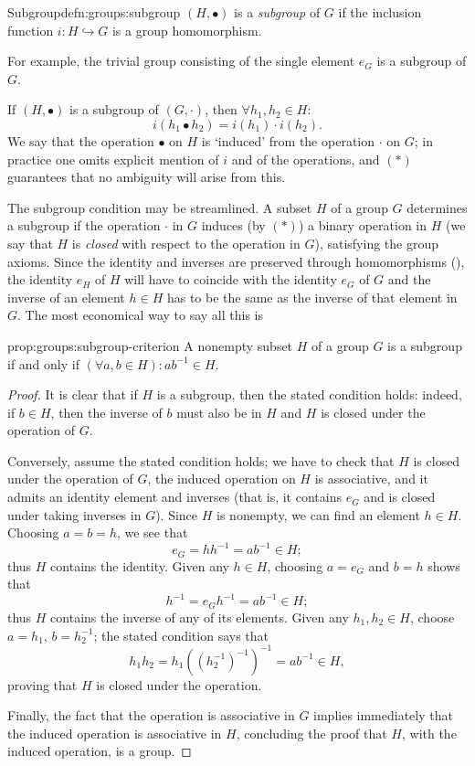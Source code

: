 \begin{defn}{Subgroup}{defn:groups:subgroup}
  $(H, \bullet)$ is a \emph{subgroup} of $G$ if the inclusion function
  $i : H \hookrightarrow G$ is a group homomorphism.
\end{defn}

For example, the trivial group consisting of the single element $e_G$
is a subgroup of $G$.

If $(H, \bullet)$ is a subgroup of $(G, \cdot)$, then
$\forall h_1, h_2 \in H$:
\[
  i(h_1 \bullet h_2) = i(h_1) \cdot i(h_2). \tag{$*$}
\]
We say that the operation $\bullet$ on $H$ is `induced' from the
operation $\cdot$ on $G$; in practice one omits explicit mention of
$i$ and of the operations, and $(*)$ guarantees that no ambiguity will
arise from this.

The subgroup condition may be streamlined. A subset $H$ of a group $G$
determines a subgroup if the operation $\cdot$ in $G$ induces (by
$(*)$) a binary operation in $H$ (we say that $H$ is \emph{closed}
with respect to the operation in $G$), satisfying the group
axioms. Since the identity and inverses are preserved through
homomorphisms (), the
identity $e_H$ of $H$ will have to coincide with the identity $e_G$ of
$G$ and the inverse of an element $h \in H$ has to be the same as the
inverse of that element in $G$. The most economical way to say all
this is

\begin{prop}{}{prop:groups:subgroup-criterion}
  A nonempty subset $H$ of a group $G$ is a subgroup if and
    only if
    $(\forall a, b \in H) : ab^{-1} \in
    H$.
\end{prop}
\begin{proof}
  It is clear that if $H$ is a subgroup, then the stated condition
  holds: indeed, if $b \in H$, then the inverse of $b$ must also be in
  $H$ and $H$ is closed under the operation of $G$.

  Conversely, assume the stated condition holds; we have to check that
  $H$ is closed under the operation of $G$, the induced operation on
  $H$ is associative, and it admits an identity element and inverses
  (that is, it contains $e_G$ and is closed under taking inverses in
  $G$). Since $H$ is nonempty, we can find an element $h \in
  H$. Choosing $a = b = h$, we see that
  \[
    e_G = hh^{-1} = ab^{-1} \in H;
  \]
  thus $H$ contains the identity. Given any $h \in H$, choosing
  $a = e_G$ and $b = h$ shows that
  \[
    h^{-1} = e_G h^{-1} = ab^{-1} \in H;
  \]
  thus $H$ contains the inverse of any of its elements. Given any
  $h_1, h_2 \in H$, choose $a = h_1$, $b = h_2^{-1}$; the stated
  condition says that
  \[
    h_1 h_2 = h_1((h_2^{-1})^{-1})^{-1} = ab^{-1} \in H,
  \]
  proving that $H$ is closed under the operation.

  Finally, the fact that the operation is associative in $G$ implies
  immediately that the induced operation is associative in $H$,
  concluding the proof that $H$, with the induced operation, is a
  group.
\end{proof}

